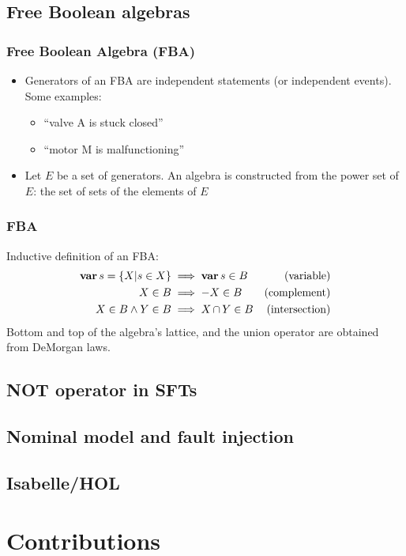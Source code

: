 \documentclass{beamer}
\def\FBA{%
	Free Boolean Algebra (FBA)%
	\gdef\FBA{FBA\xspace}%
	\gdef\FBAs{FBAs\xspace}%
	\gdef\iFBA{an FBA\xspace}%
	\xspace%
}
\def\FBAs{%
	Free Boolean Algebras (FBAs)%
	\gdef\FBA{FBA\xspace}%
	\gdef\FBAs{FBAs\xspace}%
	\gdef\iFBA{an FBA\xspace}%
	\xspace%
}
\def\iFBA{%
	a Free Boolean Algebra (FBA)%
	\gdef\FBA{FBA\xspace}%
	\gdef\FBAs{FBAs\xspace}%
	\gdef\iFBA{an FBA\xspace}%
	\xspace%
}
\def\varop{\ensuremath\operatorname{\mathbf{var}}}
\newcommand{\var}[1]{\ensuremath\varop #1}
\def\inter{\ensuremath\operatorname{\cap}}
\begin{document}
\subsection{Free Boolean algebras}

\begin{frame}
	\frametitle{\FBA}
	\begin{itemize}
		\item Generators of \iFBA are independent statements (or independent events). Some examples:
		\begin{itemize}
			\item ``valve A is stuck closed''
			\item ``motor M is malfunctioning''
		\end{itemize}
		\item Let $E$ be a set of generators. An algebra is constructed from the power set of $E$: the set of sets of the elements of $E$
	\end{itemize}
\end{frame}

\begin{frame}[fragile]
	\frametitle{\FBA}
	Inductive definition of \iFBA:
	\begin{subequations}
		\begin{align}
		\var s = \{X | s \in X\} & \implies \var s \in B & \text{(variable)}\\
		X \in B & \implies -X \in B                           & \text{(complement)}\\
		X \in B \land Y \in B & \implies X \inter Y \in B     & \text{(intersection)}
		\end{align}
	\end{subequations}
	Bottom and top of the algebra's lattice, and the union operator are obtained from DeMorgan laws.
\end{frame}

\subsection{NOT operator in SFTs}
\subsection{Nominal model and fault injection}
\subsection{Isabelle/HOL}

\section{Contributions}
\end{document}
